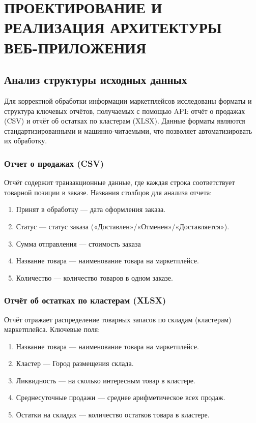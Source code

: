 \chapter{ПРОЕКТИРОВАНИЕ И РЕАЛИЗАЦИЯ АРХИТЕКТУРЫ ВЕБ-ПРИЛОЖЕНИЯ}

\section{Анализ структуры исходных данных}
Для корректной обработки информации маркетплейсов исследованы форматы и структура ключевых отчётов, получаемых с помощью API: отчёт о продажах (CSV) и отчёт об остатках по кластерам (XLSX). Данные форматы являются стандартизированными и машинно-читаемыми, что позволяет автоматизировать их обработку.

\subsection{Отчет о продажах (CSV)}
Отчёт содержит транзакционные данные, где каждая строка соответствует товарной позиции в заказе. Названия столбцов для анализа отчета: 

\begin{enumerate}
\item Принят в обработку — дата оформления заказа.
\item Статус — статус заказа («Доставлен»/«Отменен»/«Доставляется»).
\item Сумма отправления — стоимость заказа
\item Название товара — наименование товара на маркетплейсе.
\item Количество — количество товаров в одном заказе.
\end{enumerate}

\subsection{Отчёт об остатках по кластерам (XLSX)}
Отчёт отражает распределение товарных запасов по складам (кластерам) маркетплейса. Ключевые поля:

\begin{enumerate}
\item Название товара — наименование товара на маркетплейсе.
\item Кластер — Город размещения склада.
\item Ликвидность — на сколько интересным товар в кластере.
\item Среднесуточные продажи — среднее арифметическое всех продаж.
\item Остатки на складах — количество остатков товара в кластере.
\end{enumerate}

